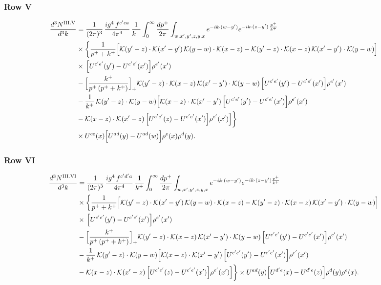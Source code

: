 \documentclass[9pt]{article}
\numberwithin{equation}{section}
\begin{document}
\subsubsection*{Row V}
\begin{align}
\frac{d^{3}N^{\rm III.V}}{d^{3}k} & =\frac{1}{(2\pi)^{3}}\,\frac{ig^{4}\,f^{c'ca}}{4\pi^{4}}\,\frac{1}{k^{+}}\int_{0}^{\infty}\frac{dp^{+}}{2\pi}\int_{w,x',y',z,y,x}e^{-ik\cdot(w-y')}e^{-ik\cdot(z-y')\,\frac{p^{+}}{k^{+}}}\notag\\
&\times\bigg\{\frac{1}{p^{+}+k^{+}}\Big[\mathcal{K}(y'-z)\cdot\mathcal{K}(x'-y')\,\mathcal{K}(y-w)\cdot\mathcal{K}(x-z)-\mathcal{K}(y'-z)\cdot\mathcal{K}(x-z)\,\mathcal{K}(x'-y')\cdot\mathcal{K}(y-w)\Big]\notag\\
&\times\,\Big[U^{c'e'}(y')-U^{c'e'}(x')\Big]\rho^{e'}(x')\notag\\
&-\Big[\frac{k^{+}}{p^{+}\,(p^{+}+k^{+})}\Big]_{+}\mathcal{K}(y'-z)\cdot\mathcal{K}(x-z)\,\mathcal{K}(x'-y')\cdot\mathcal{K}(y-w)\,\Big[U^{c'e'}(y')-U^{c'e'}(x')\Big]\rho^{e'}(x')\notag\\
&-\frac{1}{k^{+}}\,\mathcal{K}(y'-z)\cdot\mathcal{K}(y-w)\Big[\mathcal{K}(x-z)\cdot\mathcal{K}(x'-y')\,\Big[U^{c'e'}(y')-U^{c'e'}(x')\Big]\rho^{e'}(x')\notag\\
&-\mathcal{K}(x-z)\cdot\mathcal{K}(x'-z)\,\Big[U^{c'e'}(z)-U^{c'e'}(x')\Big]\rho^{e'}(x')\Big]\bigg\}\notag\\
&\times U^{ce}(x)\Big[U^{ad}(y)-U^{ad}(w)\Big]\rho^{e}(x)\rho^{d}(y).\label{eq:B-III5}
\end{align}
\subsubsection*{Row VI}
\begin{align}
\frac{d^{3}N^{\rm III.VI}}{d^{3}k} & =\frac{1}{(2\pi)^{3}}\,\frac{ig^{4}\,f^{c'd'a}}{4\pi^{4}}\,\frac{1}{k^{+}}\int_{0}^{\infty}\frac{dp^{+}}{2\pi}\int_{w,x',y',z,y,x}e^{-ik\cdot(w-y')}e^{-ik\cdot(z-y')\frac{p^{+}}{k^{+}}}\notag\\
&\times\bigg\{\frac{1}{p^{+}+k^{+}}\Big[\mathcal{K}(y'-z)\cdot\mathcal{K}(x'-y')\,\mathcal{K}(y-w)\cdot\mathcal{K}(x-z)-\mathcal{K}(y'-z)\cdot\mathcal{K}(x-z)\,\mathcal{K}(x'-y')\cdot\mathcal{K}(y-w)\Big]\notag\\
&\times\,\Big[U^{c'e'}(y')-U^{c'e'}(x')\Big]\rho^{e'}(x')\notag\\
&-\Big[\frac{k^{+}}{p^{+}\,(p^{+}+k^{+})}\Big]_{+}\mathcal{K}(y'-z)\cdot\mathcal{K}(x-z)\,\mathcal{K}(x'-y')\cdot\mathcal{K}(y-w)\,\Big[U^{c'e'}(y')-U^{c'e'}(x')\Big]\rho^{e'}(x')\notag\\
&-\frac{1}{k^{+}}\,\mathcal{K}(y'-z)\cdot\mathcal{K}(y-w)\Big[\mathcal{K}(x-z)\cdot\mathcal{K}(x'-y')\,\Big[U^{c'e'}(y')-U^{c'e'}(x')\Big]\rho^{e'}(x')\notag\\
&-\mathcal{K}(x-z)\cdot\mathcal{K}(x'-z)\,\Big[U^{c'e'}(z)-U^{c'e'}(x')\Big]\rho^{e'}(x')\Big]\bigg\}\times U^{ad}(y)\Big[U^{d'e}(x)-U^{d'e}(z)\Big]\rho^{d}(y)\rho^{e}(x).\label{eq:B-III6}
\end{align}
\end{document}
